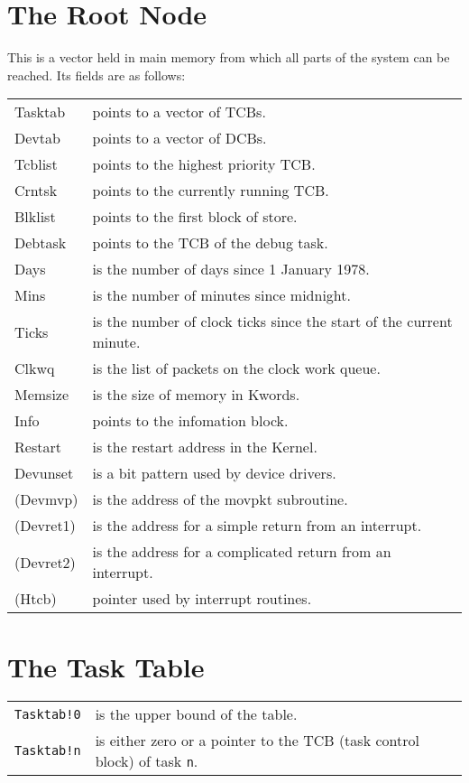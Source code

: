 \section{The Root Node}

     This is a vector held in main memory from which all parts of the
system can be reached.  Its fields are as follows:

\begin{tabular}{lp{8.5cm}}
     Tasktab   & points to a vector of TCBs.\\
     Devtab    & points to a vector of DCBs.\\
     Tcblist   & points to the highest priority TCB.\\
     Crntsk    & points to the currently running TCB.\\
     Blklist   & points to the first block of store.\\
     Debtask   & points to the TCB of the debug task.\\
     Days      & is the number of days since 1 January 1978.\\
     Mins      & is the number of minutes since midnight.\\
     Ticks     & is the number of clock ticks since the start of the
current minute.\\
     Clkwq     & is the list of packets on the clock work queue.\\
     Memsize   & is the size of memory in Kwords.\\
     Info      & points to the infomation block.\\
     Restart   & is the restart address in the Kernel.\\
     Devunset  & is a bit pattern used by device drivers.\\
     (Devmvp)  & is the address of the movpkt subroutine.\\
     (Devret1) & is the address for a simple return from an interrupt.\\
     (Devret2) & is the address for a complicated return from an interrupt.\\
     (Htcb)    & pointer used by interrupt routines.\\
\end{tabular}

\section{The Task Table}

\begin{tabular}{lp{8.5cm}}
     \verb|Tasktab!0|&is the upper bound of the table.\\
     \verb|Tasktab!n|&is either zero or a pointer to the TCB (task
     control block) of task \verb|n|.\\
\end{tabular}

